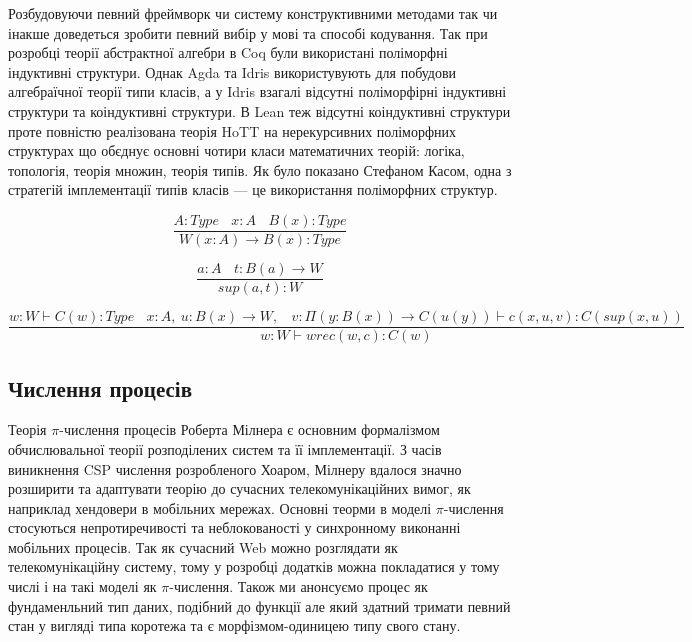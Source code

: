 Розбудовуючи певний фреймворк чи систему конструктивними методами
так чи інакше доведеться зробити певний вибір у мові та способі кодування.
Так при розробці теорії абстрактної алгебри в Coq були використані
поліморфні індуктивні структури. Однак Agda та Idris використувують
для побудови алгебраїчної теорії типи класів, а у Idris взагалі відсутні
поліморфірні індуктивні структури та коіндуктивні структури. В Lean
теж відсутні коіндуктивні структури проте повністю реалізована теорія
HoTT на нерекурсивних поліморфних структурах що обєднує основні чотири
класи математичних теорій: логіка, топологія, теорія множин, теорія типів.
Як було показано Стефаном Касом, одна з стратегій імплементації типів
класів --- це використання поліморфних структур.

\begin{equation}
\tag{$W$-formation}
\dfrac{A:Type\ \ \ \ x:A\ \ \ \ B(x):Type}
      {W (x:A) \rightarrow B(x) : Type}
\end{equation}

\begin{equation}
\tag{$W$-intro}
\dfrac{a:A\ \ \ \ t: B(a) \rightarrow W}
      {sup(a,t) : W}
\end{equation}

\begin{equation}
\tag{$W$-elimination}
\dfrac{w: W \vdash C(w) : Type\ \ \ \ x:A,\ u:B(x) \rightarrow W,\ \ \ \ v:\Pi (y:B(x)) \rightarrow C(u(y)) \vdash c(x,u,v):C(sup(x,u))}
      {w:W \vdash wrec(w,c):C(w)}
\end{equation}

\newpage
    \subsection*{Числення процесів}
    Теорія $\pi$-числення процесів Роберта Мілнера є основним формалізмом обчислювальної
    теорії розподілених систем та її імплементації. З часів виникнення CSP числення розробленого Хоаром,
    Мілнеру вдалося значно розширити та адаптувати теорію до сучасних
    телекомунікаційних вимог, як наприклад хендовери в мобільних мережах.
    Основні теорми в моделі $\pi$-числення стосуються непротиречивості та неблокованості
    у синхронному виконанні мобільних процесів. Так як сучасний Web можно розглядати
    як телекомунікаційну систему, тому у розробці додатків можна покладатися у тому
    числі і на такі моделі як $\pi$-числення.
    Також ми анонсуємо процес як фундаменльний тип даних, подібний до функції але який здатний
    тримати певний стан у вигляді типа коротежа та є морфізмом-одиницею типу свого стану.

